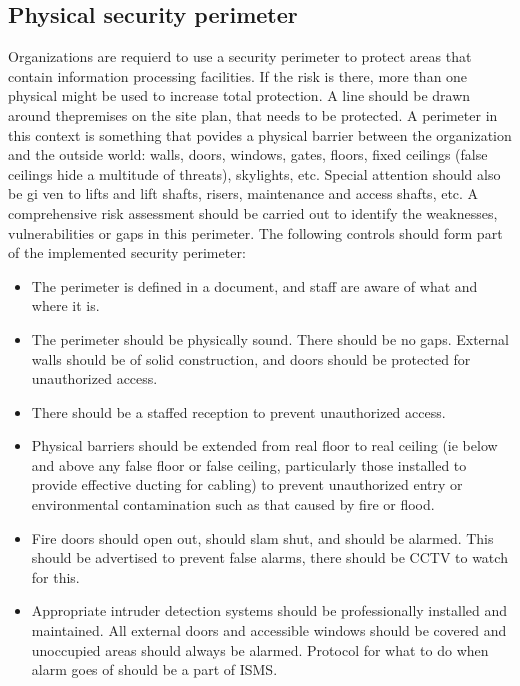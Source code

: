 \subsection{Physical security perimeter}
Organizations are requierd to use a security perimeter to protect areas that 
contain information processing facilities. If the risk is there, more than one 
physical might be used to increase total protection. A line should be drawn 
around thepremises on the site plan, that needs to be protected. A perimeter in 
this context is something that povides a physical barrier between the 
organization and the outside world:  walls, doors, windows, gates, floors, fixed
ceilings (false ceilings hide a multitude of threats), skylights, etc. Special
attention should also be gi ven to lifts and lift shafts, risers, maintenance 
and access shafts, etc. A comprehensive risk assessment should be carried out to
identify the weaknesses, vulnerabilities or gaps in this perimeter.
The following controls should form part of the implemented security perimeter:
\begin{itemize} 
    \item The perimeter is defined in a document, and staff are aware of what 
    and where it is.

    \item The perimeter should be physically sound. There should be no gaps.
    External walls should be of solid construction, and doors should be protected
    for unauthorized access.

    \item There should be a staffed reception to prevent unauthorized access.

    \item Physical barriers should be extended from real floor to real ceiling
    (ie below and above any false floor or false ceiling, particularly those 
    installed to provide effective ducting for cabling) to prevent unauthorized 
    entry or environmental contamination such as that caused by fire or flood.

    \item Fire doors should open out, should slam shut, and should be alarmed.
    This should be advertised to prevent false alarms, there should be CCTV to
    watch for this.

    \item Appropriate intruder detection systems should be professionally
    installed and maintained. All external doors and accessible windows
    should be covered and unoccupied areas should always be alarmed.
    Protocol for what to do when alarm goes of should be a part of ISMS.
\end{itemize}

